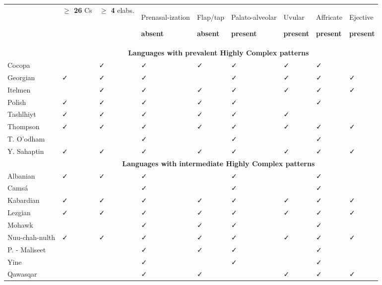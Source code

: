 \begin{table}
\begin{tabularx}{\textwidth}{XXXXXXXXX}
\lsptoprule
 & \textbf{${\geq}$ 26} Cs & \textbf{${\geq}$ 4} elabs. & { Prenasal-ization}

 \textbf{absent} & { Flap/tap}

 \textbf{absent} & { Palato-alveolar}

 \textbf{present} & { Uvular}

 \textbf{present} & { Affricate}

 \textbf{present} & { Ejective}

 \textbf{present}\\
& \multicolumn{8}{c}{ \textbf{Languages with prevalent Highly Complex patterns}}\\
\hhline{~--------}
 Cocopa &  & ✓ & ✓ & ✓ & ✓ & ✓ & ✓ & \\
\hhline{~--------}
 Georgian & ✓ & ✓ & ✓ &  & ✓ & ✓ & ✓ & ✓\\
\hhline{~--------}
 Itelmen &  & ✓ & ✓ & ✓ & ✓ & ✓ & ✓ & ✓\\
\hhline{~--------}
 Polish & ✓ & ✓ & ✓ & ✓ & ✓ &  & ✓ & \\
\hhline{~--------}
 Tashlhiyt & ✓ & ✓ & ✓ & ✓ & ✓ & ✓ &  & \\
\hhline{~--------}
 Thompson & ✓ & ✓ & ✓ & ✓ & ✓ & ✓ & ✓ & ✓\\
\hhline{~--------}
 T. O’odham &  &  & ✓ &  & ✓ &  & ✓ & \\
\hhline{~--------}
 Y. Sahaptin & ✓ & ✓ & ✓ & ✓ & ✓ & ✓ & ✓ & ✓\\
& \multicolumn{8}{c}{ \textbf{Languages with intermediate Highly Complex patterns}}\\
\hhline{~--------}
 Albanian & ✓ & ✓ & ✓ &  & ✓ &  & ✓ & \\
\hhline{~--------}
 Camsá &  &  & ✓ &  & ✓ &  & ✓ & \\
\hhline{~--------}
 Kabardian & ✓ & ✓ & ✓ & ✓ & ✓ & ✓ & ✓ & ✓\\
\hhline{~--------}
 Lezgian & ✓ & ✓ & ✓ & ✓ & ✓ & ✓ & ✓ & ✓\\
\hhline{~--------}
 Mohawk &  &  & ✓ & ✓ & ✓ &  & ✓ & \\
\hhline{~--------}
 Nuu-chah-nulth & ✓ & ✓ & ✓ & ✓ & ✓ & ✓ & ✓ & ✓\\
\hhline{~--------}
 P. - Maliseet &  &  & ✓ & ✓ & ✓ &  & ✓ & \\
\hhline{~--------}
 Yine &  &  & ✓ &  & ✓ &  & ✓ & \\
\hhline{~--------}
 Qawasqar &  &  & ✓ & ✓ &  & ✓ & ✓ & ✓\\

\end{tabularx}
\end{table}
